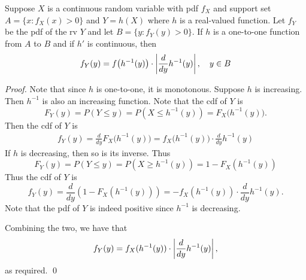 \documentclass[notoc,notitlepage]{tufte-book}
\begin{document}
\begin{thm}
\label{thm:one_to_one_transformation_of_a_random_variable}
  Suppose $X$ is a continuous random variable with pdf $f_X$ and support set $A = \{x : f_X(x) > 0\}$ and $Y = h(X)$ where $h$ is a real-valued function. Let $f_Y$ be the pdf of the rv $Y$ and let $B = \{y : f_Y(y) > 0\}$. If $h$ is a one-to-one function from $A$ to $B$ and if $h'$ is continuous, then
  \begin{equation*}
    f_Y(y) = f \big( h^{-1}(y) \big) \cdot \left| \frac{d}{dy}h^{-1}(y) \right|, \quad y \in B
  \end{equation*}
\end{thm}

\begin{proof}
  Note that since $h$ is one-to-one, it is monotonous. Suppose $h$ is increasing. Then $h^{-1}$ is also an increasing function. Note that the cdf of $Y$ is
  \begin{equation*}
    F_Y(y) = P(Y \leq y) = P(X \leq h^{-1}(y)) = F_X \big( h^{-1}(y) \big).
  \end{equation*}
  Then the cdf of $Y$ is
  \begin{align*}
    f_Y(y) = \frac{d}{dy} F_X \big( h^{-1}(y) \big) = f_X \big( h^{-1}(y) \big) \cdot \frac{d}{dy} h^{-1}(y)
  \end{align*}
  If $h$ is decreasing, then so is its inverse. Thus
  \begin{equation*}
    F_Y(y) = P(Y \leq y) =  P(X \geq h^{-1}(y)) = 1 - F_X( h^{-1}(y) )
  \end{equation*}
  Thus the cdf of $Y$ is
  \begin{equation*}
    f_Y(y) = \frac{d}{dy} ( 1 - F_X( h^{-1}(y) ) ) = - f_X( h^{-1} (y) ) \cdot \frac{d}{dy} h^{-1}(y).
  \end{equation*}
  Note that the pdf of $Y$ is indeed positive since $h^{-1}$ is decreasing.

  Combining the two, we have that
  \begin{equation*}
    f_Y(y) = f_X( h^{-1}(y) ) \cdot \left| \frac{d}{dy} h^{-1}(y) \right|,
  \end{equation*}
  as required. \qed
\end{proof}



\end{document}
